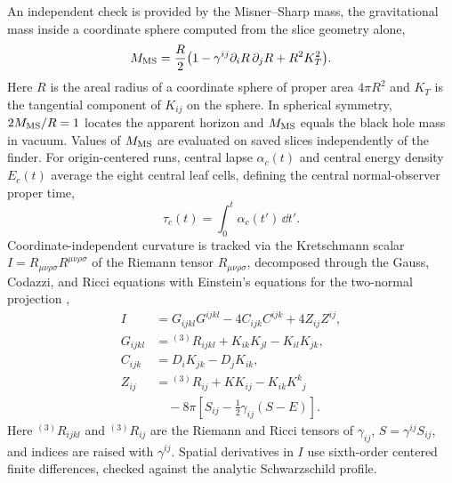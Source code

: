 An independent check is provided by the Misner--Sharp mass, the gravitational mass inside a coordinate sphere computed from the slice geometry alone,
\begin{equation}\label{eq:misner_sharp}
M_{\rm MS} = \frac{R}{2}\bigl(1 - \gamma^{ij}\partial_i R\,\partial_j R + R^2 K_T^2\bigr).
\end{equation}
Here $R$ is the areal radius of a coordinate sphere of proper area $4\pi R^2$ and $K_T$ is the tangential component of $K_{ij}$ on the sphere. In spherical symmetry, $2M_{\rm MS}/R = 1$ locates the apparent horizon and $M_{\rm MS}$ equals the black hole mass in vacuum. Values of $M_{\rm MS}$ are evaluated on saved slices independently of the finder. For origin-centered runs, central lapse $\alpha_c(t)$ and central energy density $E_c(t)$ average the eight central leaf cells, defining the central normal-observer proper time,
\begin{equation}\label{eq:central_proper_time}
\tau_c(t) = \int_0^t \alpha_c(t')\,\dd t'.
\end{equation}
Coordinate-independent curvature is tracked via the Kretschmann scalar $I = R_{\mu\nu\rho\sigma} R^{\mu\nu\rho\sigma}$ of the Riemann tensor $R_{\mu\nu\rho\sigma}$, decomposed through the Gauss, Codazzi, and Ricci equations with Einstein's equations for the two-normal projection \cite{Wu:2026nrpic},
\begin{align}\label{eq:kretschmann}
I &= G_{ijkl}G^{ijkl} - 4 C_{ijk}C^{ijk} + 4 Z_{ij}Z^{ij}, \nonumber\\
G_{ijkl} &= {}^{(3)}R_{ijkl} + K_{ik}K_{jl} - K_{il}K_{jk}, \nonumber\\
C_{ijk} &= D_i K_{jk} - D_j K_{ik}, \nonumber\\
Z_{ij} &= {}^{(3)}R_{ij} + K K_{ij} - K_{ik}K^k{}_j \nonumber\\
       &\quad - 8\pi\left[S_{ij} - \frac{1}{2}\gamma_{ij}(S - E)\right].
\end{align}
Here ${}^{(3)}R_{ijkl}$ and ${}^{(3)}R_{ij}$ are the Riemann and Ricci tensors of $\gamma_{ij}$, $S = \gamma^{ij}S_{ij}$, and indices are raised with $\gamma^{ij}$. Spatial derivatives in $I$ use sixth-order centered finite differences, checked against the analytic Schwarzschild profile.

